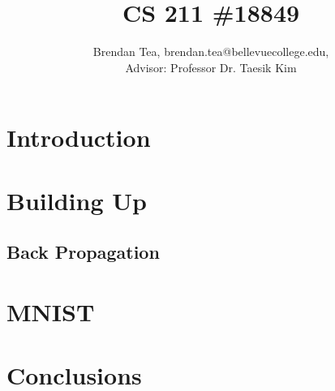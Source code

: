 \documentclass[10pt,a4paper,twocolumn]{article}
\title{\vspace{-0.5in}{\bfseries\scshape 
    Minilistic MNIST Utilizing Modern Optimizations
    } \\ 
    \vspace{1ex} 
    \normalsize{CS 211 \#18849}\vspace{-2ex}
}
\author{
    \normalsize{Brendan Tea, brendan.tea@bellevuecollege.edu,} \\ 
    \normalsize{Advisor: Professor Dr. Taesik Kim}
}
\date{\vspace{-5ex}}
\begin{document}
\twocolumn[
  \maketitle
  \begin{@twocolumnfalse}
    
  \end{@twocolumnfalse}
]

\thispagestyle{firststyle}

\titlespacing{\section}{0pt}{0pt}{0.25em}
\titlespacing{\subsection}{0pt}{0pt}{0.25em}
\setlength{\parskip}{1em}   
\setlength{\parindent}{0pt}

\section{Introduction} \label{sec:introduction}


\section{Building Up}\label{sec:building}


\subsection{Back Propagation}


\section{MNIST}\label{sec:mnist}


\section{Conclusions}\label{sec:conclusions}





\clearpage

%     
%     
\end{document}
